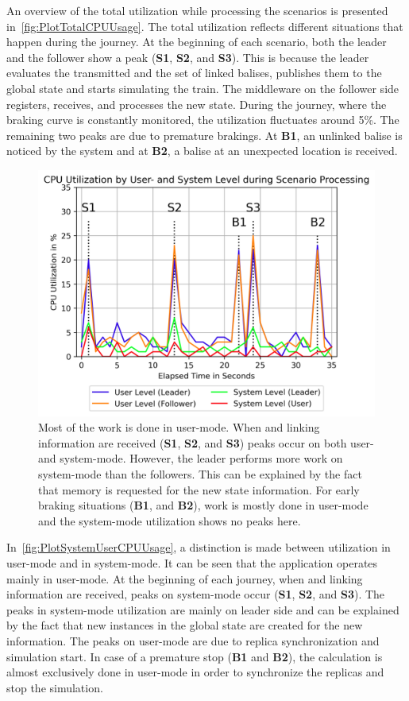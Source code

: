 An overview of the total  utilization while processing the scenarios is presented in~\autoref{fig:PlotTotalCPUUsage}.
The total  utilization reflects different situations that happen during the journey.
At the beginning of each scenario, both the leader and the follower show a peak (\textbf{S1}, \textbf{S2}, and \textbf{S3}).
This is because the leader evaluates the transmitted  and the set of linked balises, publishes them to the global state and starts simulating the train.
The middleware on the follower side registers, receives, and processes the new state.
During the journey, where the braking curve is constantly monitored, the utilization fluctuates around 5\%.
The remaining two peaks are due to premature brakings.
At \textbf{B1}, an unlinked balise is noticed by the system and at \textbf{B2}, a balise at an unexpected location is received.

\begin{figure}[!hbt]
	\centering
	\includegraphics[width=0.8\linewidth]{images/plots/SystemUserCPUUsage}
	\caption{Most of the  work is done in user-mode. When  and linking information are received (\textbf{S1}, \textbf{S2}, and \textbf{S3}) peaks occur on both user- and system-mode. However, the leader performs more work on system-mode than the followers. This can be explained by the fact that memory is requested for the new state information. For early braking situations (\textbf{B1}, and \textbf{B2}), work is mostly done in user-mode and the system-mode utilization shows no peaks here.}
	\label{fig:PlotSystemUserCPUUsage}
\end{figure}

In~\autoref{fig:PlotSystemUserCPUUsage}, a distinction is made between  utilization in user-mode and in system-mode.
It can be seen that the application operates mainly in user-mode.
At the beginning of each journey, when  and linking information are received, peaks on system-mode occur (\textbf{S1}, \textbf{S2}, and \textbf{S3}).
The peaks in system-mode utilization are mainly on leader side and can be explained by the fact that new instances in the global state are created for the new information.
The peaks on user-mode are due to replica synchronization and simulation start.
In case of a premature stop (\textbf{B1} and \textbf{B2}), the calculation is almost exclusively done in user-mode in order to synchronize the replicas and stop the simulation.

